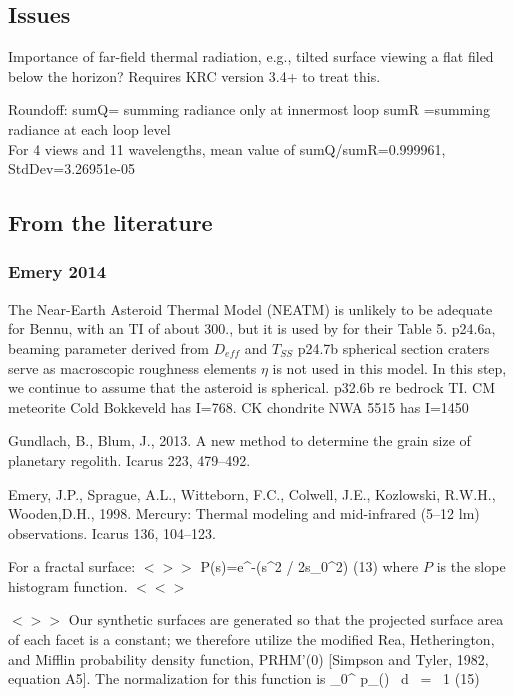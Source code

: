 \documentclass{article}
\newcommand{\qeq}{\hspace{25.mm}} %
\newcommand{\bq}{$ < \! > \!   \! >$ } %
\newcommand{\eq}{ $< \! \! < \! > $ } %
\begin{document}
 

\subsection{Issues}  %
Importance of far-field thermal radiation, e.g., tilted surface viewing a flat
filed below the horizon? Requires KRC version 3.4+ to treat this.

 Roundoff:
\qi sumQ= summing radiance only at innermost loop 
\qi sumR =summing radiance at each loop level
\\ For 4 views and 11 wavelengths, mean value of sumQ/sumR=0.999961, StdDev=3.26951e-05

\subsection{From the literature}

\subsubsection{Emery 2014}
The Near-Earth Asteroid Thermal Model (NEATM)  is unlikely to be
adequate for Bennu, with an TI of about 300., but it is used by 
for their Table 5.
\qi p24.6a, beaming parameter derived from $D_{eff}$ and $T_{SS}$
\qi p24.7b spherical section craters serve as macroscopic roughness elements 
\qi $\eta$ is not used in this model. In this step, we continue to assume that the
asteroid is spherical.
\qi p32.6b re bedrock TI. CM meteorite Cold Bokkeveld has I=768. CK chondrite NWA 5515 has I=1450 

Gundlach, B., Blum, J., 2013. A new method to determine the grain size of
planetary regolith. Icarus 223, 479–492.

Emery, J.P., Sprague, A.L., Witteborn, F.C., Colwell, J.E., Kozlowski, R.W.H.,
Wooden,D.H., 1998. Mercury: Thermal modeling and mid-infrared (5–12 lm)
observations. Icarus 136, 104–123.


 For a fractal surface: \bq \qb P(s)=e^{-(s^2 /
  2s_0^2)} \qeq (13) \qe where $P$ is the slope histogram function. \eq

\bq Our synthetic surfaces are generated so that the projected surface area of
each facet is a constant; we therefore utilize the modified Rea, Hetherington,
and Mifflin probability density function, PRHM'(0) [Simpson and Tyler, 1982,
  equation A5]. The normalization for this function is
 \pi \int_0^ p_(\theta) \sin \theta \ d \theta \ = \ 1 \qeq (15) \qe 
\end{document}
